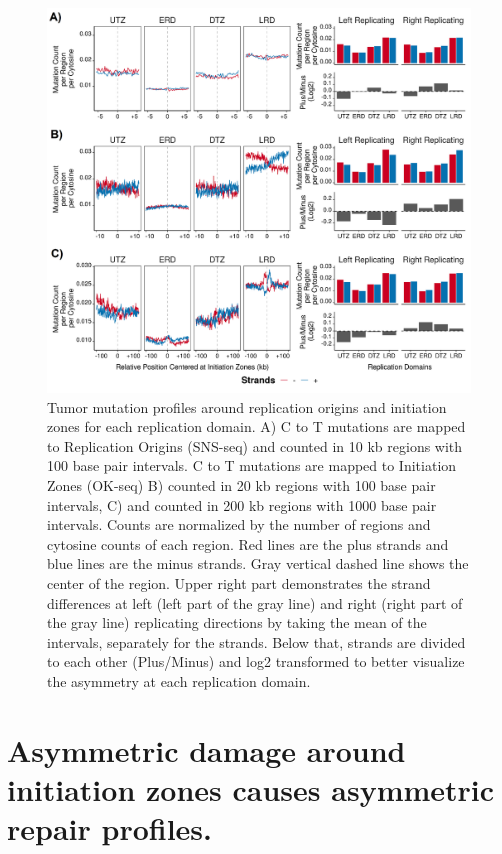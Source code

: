 \begin{figure}[H]
    \begin{center}
    \includegraphics[width=\textwidth]{Chapters/4_results/figures/fig4}
    \caption[Tumor mutation profiles around replication origins and initiation zones for each replication domain.]{Tumor mutation profiles around replication origins and initiation zones for each replication domain. A) C to T mutations are mapped to Replication Origins (SNS-seq) and counted in 10 kb regions with 100 base pair intervals. C to T mutations are mapped to Initiation Zones (OK-seq) B) counted in 20 kb regions with 100 base pair intervals, C) and counted in 200 kb regions with 1000 base pair intervals. Counts are normalized by the number of regions and cytosine counts of each region. Red lines are the plus strands and blue lines are the minus strands. Gray vertical dashed line shows the center of the region. Upper right part demonstrates the strand differences at left (left part of the gray line) and right (right part of the gray line) replicating directions by taking the mean of the intervals, separately for the strands. Below that, strands are divided to each other (Plus/Minus) and log2 transformed to better visualize the asymmetry at each replication domain.}
    \label{fig:mutation}
    \end{center}
    \end{figure}

\section{Asymmetric damage around initiation zones causes asymmetric repair profiles.}

